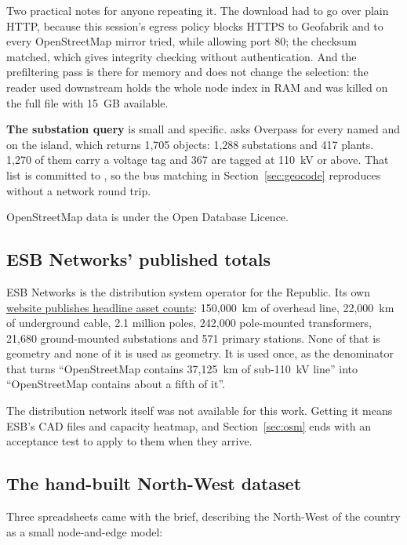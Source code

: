 \documentclass[11pt,a4paper]{article}
\begin{document}
Two practical notes for anyone repeating it. The download had to go over plain
HTTP, because this session's egress policy blocks HTTPS to Geofabrik and to
every OpenStreetMap mirror tried, while allowing port 80; the checksum matched,
which gives integrity checking without authentication. And the prefiltering
pass is there for memory and does not change the selection: the reader used
downstream holds the whole node index in RAM and was killed on the full file
with 15~GB available.

\textbf{The substation query} is small and specific.  asks
Overpass for every named  and  on the
island, which returns 1{,}705 objects: 1{,}288 substations and 417 plants.
1{,}270 of them carry a voltage tag and 367 are tagged at 110~kV or above.
That list is committed to , so the bus
matching in Section~\ref{sec:geocode} reproduces without a network round trip.

OpenStreetMap data is under the Open Database Licence.

\subsection{ESB Networks' published totals}

ESB Networks is the distribution system operator for the Republic. Its own
\href{https://www.esbnetworks.ie/about-us/company/our-network}{website publishes headline asset counts}: 150{,}000~km of overhead line,
22{,}000~km of underground cable, 2.1 million poles, 242{,}000 pole-mounted
transformers, 21{,}680 ground-mounted substations and 571 primary stations. None of that is geometry and none of it is used as
geometry. It is used once, as the denominator that turns ``OpenStreetMap
contains 37{,}125~km of sub-110~kV line'' into ``OpenStreetMap contains about a
fifth of it''.

The distribution network itself was not available for this work. Getting it
means ESB's CAD files and capacity heatmap, and Section~\ref{sec:osm} ends with
an acceptance test to apply to them when they arrive.

\subsection{The hand-built North-West dataset}

Three spreadsheets came with the brief, describing the North-West of the
country as a small node-and-edge model:
\end{document}
